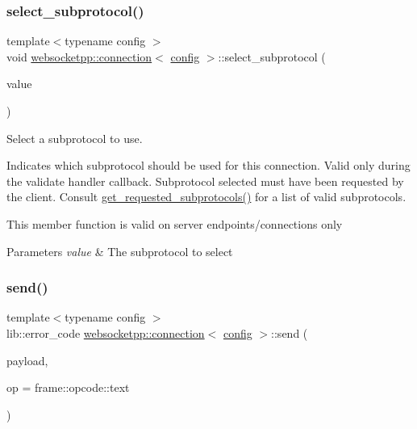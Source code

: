 \subsubsection{\texorpdfstring{select\+\_\+subprotocol()}{select\_subprotocol()}\hspace{0.1cm}{\footnotesize\ttfamily [2/2]}}
{\footnotesize\ttfamily template$<$typename config $>$ \\
void \mbox{\hyperlink{classwebsocketpp_1_1connection}{websocketpp\+::connection}}$<$ \mbox{\hyperlink{classconfig}{config}} $>$\+::select\+\_\+subprotocol (\begin{DoxyParamCaption}\item[{std\+::string const \&}]{value }\end{DoxyParamCaption})}



Select a subprotocol to use. 

Indicates which subprotocol should be used for this connection. Valid only during the validate handler callback. Subprotocol selected must have been requested by the client. Consult \mbox{\hyperlink{classwebsocketpp_1_1connection_ae0f196cb11d4a38ef59f2173424a4d51}{get\+\_\+requested\+\_\+subprotocols()}} for a list of valid subprotocols.

This member function is valid on server endpoints/connections only


\begin{DoxyParams}{Parameters}
{\em value} & The subprotocol to select \\
\hline
\end{DoxyParams}
\mbox{\label{classwebsocketpp_1_1connection_af3f96a962ed7a271a00e85ba4df2db45}} 
\subsubsection{\texorpdfstring{send()}{send()}\hspace{0.1cm}{\footnotesize\ttfamily [1/3]}}
{\footnotesize\ttfamily template$<$typename config $>$ \\
lib\+::error\+\_\+code \mbox{\hyperlink{classwebsocketpp_1_1connection}{websocketpp\+::connection}}$<$ \mbox{\hyperlink{classconfig}{config}} $>$\+::send (\begin{DoxyParamCaption}\item[{std\+::string const \&}]{payload,  }\item[{frame\+::opcode\+::value}]{op = {\ttfamily frame\+:\+:opcode\+:\+:text} }\end{DoxyParamCaption})}



